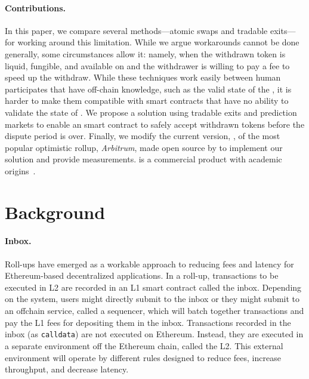 \paragraph{Contributions.} In this paper, we compare several methods---atomic swaps and tradable exits---for working around this limitation. While we argue workarounds cannot be done generally, some circumstances allow it: namely, when the withdrawn token is liquid, fungible, and available on \layerone and the withdrawer is willing to pay a fee to speed up the withdraw. While these techniques work easily between human participates that have off-chain knowledge, such as the valid state of the \layertwo, it is harder to make them compatible with \layerone smart contracts that have no ability to validate the state of \layertwo. We propose a solution using tradable exits and prediction markets to enable an \layerone smart contract to safely accept withdrawn tokens before the dispute period is over. Finally, we modify the current version, \nitro, of the most popular optimistic rollup, \textit{Arbitrum}, made open source by \offchain to implement our solution and provide measurements. \arb is a commercial product with academic origins~\cite{kalodner2018arbitrum}.
 

\section{Background} 

\paragraph{Inbox.} Roll-ups have emerged as a workable approach to reducing fees and latency for Ethereum-based decentralized applications. In a roll-up,  transactions to be executed in L2 are recorded in an L1 smart contract called the inbox. Depending on the system, users might directly submit to the inbox or they might submit to an offchain service, called a sequencer, which will batch together transactions and pay the L1 fees for depositing them in the inbox. Transactions recorded in the inbox (as \texttt{calldata}) are not executed on Ethereum. Instead, they are executed in a separate environment off the Ethereum chain, called the L2. This external environment will operate by different rules designed to reduce fees, increase throughput, and decrease latency. 

